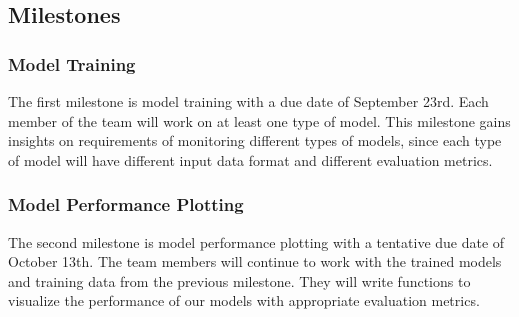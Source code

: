 \documentclass[
	letterpaper, %
	12pt, %
]{CSUniSchoolLabReport}
\begin{document}
\begin{comment}
Dequan worked on training a binary classification model. He used a bank churn dataset from Kaggle \autocite{syviaw_2021}. The task was to classify whether a client would “churn” from the features. He initially used Sklearn’s RandomForest, Adaboost, and Support Vector Machine models and achieved decent results. Finally, he used FLAML to find an even better fitted model. During the training, he realized it is crucial to monitor the composition of a feature continuously to prevent model decay. \par

Yuming worked on creating a regression model. Similarly, he will also monitor the “accuracy” of the regression. The dataset he used was the City of Baltimore Crime Data \autocite{data.world_2016}. The task was to predict the crime time with other features. He also chose FLAML to be his primary library for model training. During the training, he realized that for regression models, we can’t simply use accuracy as an evaluation metric to evaluate the model’s performance since the accuracy of the train, validation, and test sets will always be zero when accuracy is used as a regression model evaluation metric. Therefore, it is not appropriate to use accuracy as a metric for evaluating a regression model. To determine an evaluation metric for a regression model, Yuming will use the Loss functions, which are L1 and L2 functions, to evaluate the accuracy of the regression model.
\end{comment}

\subsection{Milestones}
\subsubsection{Model Training}

The first milestone is model training with a due date of September 23rd. Each member of the team will work on at least one type of model. This milestone gains insights on requirements of monitoring different types of models, since each type of model will have different input data format and different evaluation metrics.

\subsubsection{Model Performance Plotting}

The second milestone is model performance plotting with a tentative due date of October 13th. The team members will continue to work with the trained models and training data from the previous milestone. They will write functions to visualize the performance of our models with appropriate evaluation metrics. 
\end{document}
